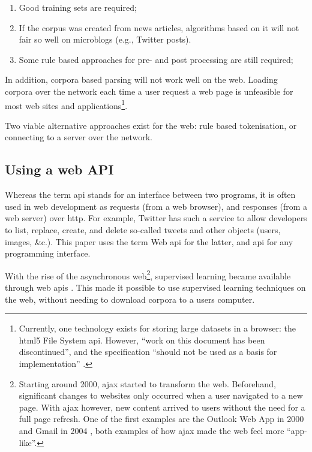 \begin{enumerate}
\item Good training sets are required;
\item If the corpus was created from news articles, algorithms based on it
  will not fair so well on microblogs (e.g., Twitter posts).
\item Some rule based approaches for pre- and post processing are still
  required;
\end{enumerate}

In addition, corpora based parsing will not work well on the web.
Loading corpora over the network each time a user request a web page is
  unfeasible for most web sites and applications\footnote{Currently,
    one technology exists for storing large datasets in a browser: the
    \acrshort{html5} File System \acrshort{api}. However, ``work on this
    document has been discontinued'', and the specification ``should not be
    used as a basis for implementation'' \autocite{urhane-file-api}.}.

Two viable alternative approaches exist for the web: rule based tokenisation,
  or connecting to a server over the network.

\subsection{Using a web API}\label{using-a-web}

Whereas the term \gls{api} stands for an interface between two programs,
  it is often used in web development as requests (from a web browser),
  and responses (from a web server) over \gls{http}.
For example, Twitter has such a service to allow developers to list,
  replace, create, and delete so-called tweets and other objects (users,
  images, \&c.).
This paper uses the term Web \gls{api} for the latter, and \gls{api} for
any programming interface.

With the rise of the asynchronous web\footnote{Starting around 2000,
    \gls{ajax} started to transform the web.
  Beforehand, significant changes to websites only occurred when a user
    navigated to a new page. 
  With \gls{ajax} however, new content arrived to users without the need
    for a full page refresh. One of the first examples are the Outlook Web
    App in 2000 \autocite{technet-outlook-web-access} and Gmail in 2004
    \autocite{gmailblog-gmail-ajax}, both examples of how \gls{ajax} made
    the web feel more ``app-like''.},
  supervised learning became available through web \glspl{api}
  \autocites{textteaser-web-api}{wordnet-web-api}{textrazor-web-api}.
This made it possible to use supervised learning techniques on the web,
  without needing to download corpora to a users computer.

